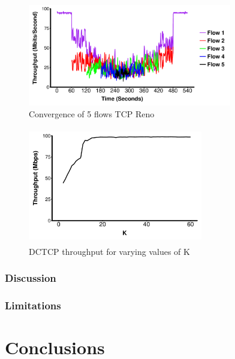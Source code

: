 \begin{figure}
\includegraphics[height=1.75in,width=3.5in]{reno_converg}
\caption{Convergence of 5 flows TCP Reno}
\end{figure}

\begin{figure}
\includegraphics[height=2in,width=3in]{k_throughput}
\caption{DCTCP throughput for varying values of K}
\end{figure}

\subsubsection{Discussion}

\subsubsection{Limitations}

\section{Conclusions}

